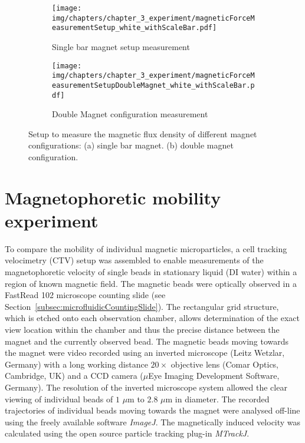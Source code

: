 \begin{figure}[htb]
        \centering
        \begin{subfigure}[t]{0.48\textwidth}
                \texttt{[image: img/chapters/chapter\_3\_experiment/magneticForceMeasurementSetup\_white\_withScaleBar.pdf]}
                \caption{Single bar magnet setup measurement}
        \end{subfigure}
        \hfill
        \begin{subfigure}[t]{0.48\textwidth}
                \texttt{[image: img/chapters/chapter\_3\_experiment/magneticForceMeasurementSetupDoubleMagnet\_white\_withScaleBar.pdf]}
                \caption{Double Magnet configuration measurement}
        \end{subfigure}  
        \caption[Magnetic flux density measurement setup]{Setup to measure the magnetic flux density of different magnet configurations: (a) single bar magnet. (b) double magnet configuration.}
        \label{fig:magneticFluxDensityMeasurementExperiment}
\end{figure}

\section{Magnetophoretic mobility experiment}\label{sec:magnetophoreticMobilityExperiment}
To compare the mobility of individual magnetic microparticles, a cell tracking velocimetry (CTV) setup was assembled to enable measurements of the magnetophoretic velocity of single beads in stationary liquid (DI water) within a region of known magnetic field. The magnetic beads were optically observed in a FastRead 102 microscope counting slide (see Section~\ref{subsec:microfluidicCountingSlide}). The rectangular grid structure, which is etched onto each observation chamber, allows determination of the exact view location within the chamber and thus the precise distance between the magnet and the currently observed bead. The magnetic beads moving towards the magnet were video recorded using an inverted microscope (Leitz Wetzlar, Germany) with a long working distance $20\times$ objective lens (Comar Optics, Cambridge, UK) and a CCD camera ($\mu$Eye Imaging Development Software, Germany). The resolution of the inverted microscope  system allowed the clear viewing of individual beads of $1$ $\mu$m to $2.8$ $\mu$m in diameter. The recorded trajectories of individual beads moving towards the magnet were analysed off-line using the freely available software \textit{ImageJ}. The magnetically induced velocity was calculated using the open source particle tracking plug-in \textit{MTrackJ}.

